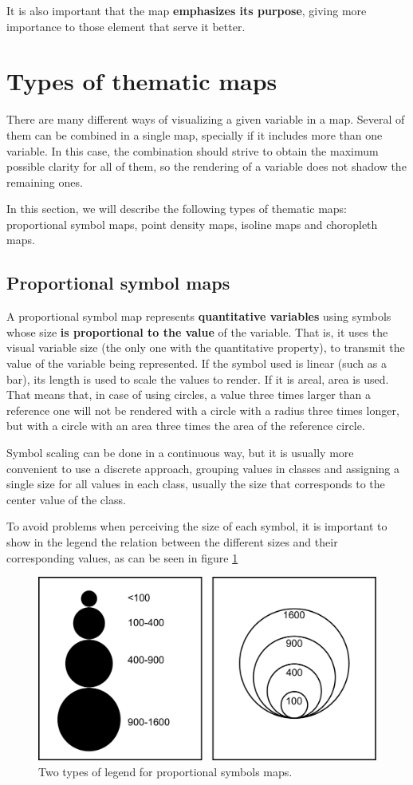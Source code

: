 It is also important that the map \textbf{emphasizes its purpose}, giving more importance to those element that serve it better.

\section{Types of thematic maps}

There are many different ways of visualizing a given variable in a map. Several of them can be combined in a single map, specially if it includes more than one variable. In this case, the combination should strive to obtain the maximum possible clarity for all of them, so the rendering of a variable does not shadow the remaining ones.

In this section, we will describe the following types of thematic maps: proportional symbol maps, point density maps, isoline maps and choropleth maps.


\subsection{Proportional symbol maps}

A proportional symbol map represents \textbf{quantitative variables} using symbols whose size \textbf{is proportional to the value} of the variable. That is, it uses the visual variable size (the only one with the quantitative property), to transmit the value of the variable being represented. If the symbol used is linear (such as a bar), its length is used to scale the values to render. If it is areal, area is used. That means that, in case of using circles, a value three times larger than a reference one will not be rendered with a circle with a radius three times longer, but with a circle with an area three times the area of the reference circle.

Symbol scaling can be done in a continuous way, but it is usually more convenient to use a discrete approach, grouping values in classes and assigning a single size for all values in each class, usually the size that corresponds to the center value of the class. 

To avoid problems when perceiving the size of each symbol, it is important to show in the legend the relation between the different sizes and their corresponding values, as can be seen in figure \ref{Fig:LegendProportionalSymbols}

\begin{figure}[!hbt]
\centering
\includegraphics[width=.65\columnwidth]{Visualization/LegendProportionalSymbols.pdf}
\caption{\small Two types of legend for proportional symbols maps.}
\label{Fig:LegendProportionalSymbols} 
\end{figure}


